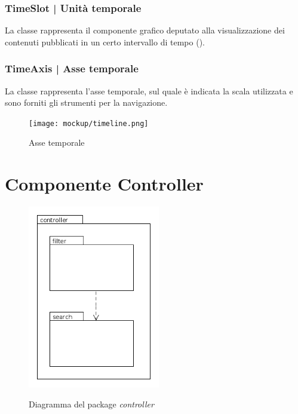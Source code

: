 \documentclass[10pt,a4paper,headinclude,footinclude,hidelinks]{scrreprt} %
\begin{document}
	\subsection[TimeSlot]{TimeSlot | Unità temporale}
	\label{sec:stage:design:view.timeline:time-slot}
	La classe \textit{} rappresenta il componente grafico deputato alla visualizzazione dei contenuti pubblicati in un certo intervallo di tempo (\textit{}).

	\subsection[TimeAxis]{TimeAxis | Asse temporale}
	\label{sec:stage:design:view.timeline:time-axis}
	La classe \textit{} rappresenta l'asse temporale, sul quale è indicata la scala utilizzata e sono forniti gli strumenti per la navigazione.

	\begin{figure}[ht]
		\begin{center}
	    	\texttt{[image: mockup/timeline.png]}
			\label{gfx:mockup:timeline:axis}
			\caption{Asse temporale}
		\end{center}
	\end{figure}

	\chapter{Componente Controller}
	\label{ch:stage:design:controller}

	\begin{figure}[ht]
		\begin{center}
	    	\includegraphics[height=8cm]{package/controller.png}
			\label{gfx:package:controller}
			\caption{Diagramma del package \textit{controller}}
		\end{center}
	\end{figure}
\end{document}

